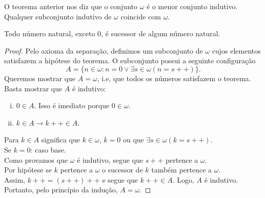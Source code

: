          O teorema anterior nos diz que o conjunto $\omega$ é o menor conjunto indutivo.
         Qualquer subconjunto indutivo de $\omega$ coincide com $\omega$.
         \begin{theorem}
            Todo número natural, exceto $0$, é sucessor de algum número natural.
            \begin{proof}
               Pelo axioma da separação, definimos um subconjunto de $\omega$
               cujos elementos satisfazem a hipótese do teorema. O subconjunto possui
               a seguinte configuração
               $$A = \{n \in \omega: n = 0 \lor \exists s \in \omega (n = s++)\}.$$
               Queremos mostrar que $A = \omega$, i.e, que 
               todos os números satisfazem o teorema.\\
               Basta mostrar que $A$ é indutivo:
               \begin{enumerate}[i.]
                  \item $0 \in A$. Isso é imediato porque $0 \in \omega$.
                  \item $k \in A \rightarrow k++ \in A$.
               \end{enumerate}
               Para $k \in A$ significa que $k \in \omega$, $k = 0$ ou que 
               $\exists s \in \omega(k = s++)$.\\
               Se $k = 0$: caso base.\\
               Como provamos que $\omega$ é indutivo, segue que $s++$ 
               pertence a $\omega$.\\
               Por hipótese se $k$ pertence a $\omega$ o sucessor de 
               $k$ também pertence a $\omega$.\\
               Assim, $k++ = (s++)++$ e segue que $k++ \in A$. 
               Logo, $A$ é indutivo.\\
               Portanto, pelo princípio da indução, $A = \omega$.
            \end{proof}
         \end{theorem}
   
